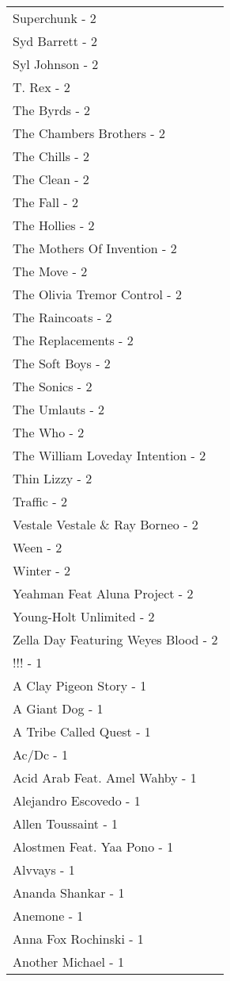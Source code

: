 \documentclass[
]{article}
\begin{document}
\begin{longtable}{l}
Superchunk - 2 \\ 
Syd Barrett - 2 \\ 
Syl Johnson - 2 \\ 
T. Rex - 2 \\ 
The Byrds - 2 \\ 
The Chambers Brothers - 2 \\ 
The Chills - 2 \\ 
The Clean - 2 \\ 
The Fall - 2 \\ 
The Hollies - 2 \\ 
The Mothers Of Invention - 2 \\ 
The Move - 2 \\ 
The Olivia Tremor Control - 2 \\ 
The Raincoats - 2 \\ 
The Replacements - 2 \\ 
The Soft Boys - 2 \\ 
The Sonics - 2 \\ 
The Umlauts - 2 \\ 
The Who - 2 \\ 
The William Loveday Intention - 2 \\ 
Thin Lizzy - 2 \\ 
Traffic - 2 \\ 
Vestale Vestale \& Ray Borneo - 2 \\ 
Ween - 2 \\ 
Winter - 2 \\ 
Yeahman Feat Aluna Project - 2 \\ 
Young-Holt Unlimited - 2 \\ 
Zella Day Featuring Weyes Blood - 2 \\ 
!!! - 1 \\ 
A Clay Pigeon Story - 1 \\ 
A Giant Dog - 1 \\ 
A Tribe Called Quest - 1 \\ 
Ac/Dc - 1 \\ 
Acid Arab Feat. Amel Wahby - 1 \\ 
Alejandro Escovedo - 1 \\ 
Allen Toussaint - 1 \\ 
Alostmen Feat. Yaa Pono - 1 \\ 
Alvvays - 1 \\ 
Ananda Shankar - 1 \\ 
Anemone - 1 \\ 
Anna Fox Rochinski - 1 \\ 
Another Michael - 1 \\ 

\end{longtable}
\end{document}

